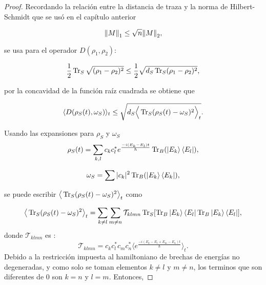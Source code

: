 \begin{proof}
Recordando la relación entre la distancia de traza y la norma de Hilbert-Schmidt que se usó en el capítulo anterior

\begin{equation}
\norm{M}_{1} \le \sqrt{n}\norm{M}_{2},
\end{equation}

se usa para el operador $D(\rho_{1}, \rho_{2})$:

\begin{equation}
\frac{1}{2} \Tr_{S} \sqrt{(\rho_{1} - \rho_{2})^{2}} \le \frac{1}{2}\sqrt{d_{S} \Tr_{S} (\rho_{1}- \rho_{2})^{2}},
\end{equation}

por la concavidad de la función raíz cuadrada se obtiene que

\begin{equation}
\langle D(\rho_{S}(t),\omega_{S}) \rangle_{t} \le \sqrt{  d_{S} \Big \langle \Tr_{S}(\rho_{S}(t)-\omega_{S})^{2} \Big \rangle_{t}}.
\end{equation}

Usando las expansiones para $\rho_{S}$ y $\omega_{S}$
\begin{equation}
\rho_{S}(t)=\sum_{k,l} c_{k} c_{l}^{*} e^{\frac{-i(E_{k}-E_{l})t}{\hbar}} \Tr_{B} (\ket{E_{k}} \bra{E_{l}}),
\end{equation}

\begin{equation}
\omega_{S} = \sum |c_{k}|^{2} \Tr_{B}(\ket{E_{k}} \bra{E_{k}}),
\end{equation}

se puede escribir $ \big \langle \Tr_{S}(\rho_{S}(t)-\omega_{S})^{2} \big \rangle_{t}$ como 

\begin{equation}
\big \langle \Tr_{S}(\rho_{S}(t)-\omega_{S})^{2}  \big \rangle_{t}=\sum_{k \neq l} \sum_{m \neq n} \mathcal{T}_{klmn} \Tr_{S} [\Tr_{B} \ket{E_{k}} \bra{E_{l}} \Tr_{B} \ket{E_{k}} \bra{E_{l}}],
\end{equation}
donde $\mathcal{T}_{klmn}$ es :
\begin{equation}
\mathcal{T}_{klmn}=c_{k}c_{l}^{*}c_{m}c_{n}^{*} \Big \langle e^{\frac{-i(E_{k}-E_{l}+E_{m}-E_{n})t}{\hbar}} \Big \rangle_{t}.
\end{equation}
Debido a la restricción impuesta al hamiltoniano de brechas de energías no degeneradas, y como solo se toman elementos $k \neq l$ y $m\neq n$, los terminos que son diferentes de $0$ son $k=n$ y $l=m$. Entonces,
 

\end{proof}
